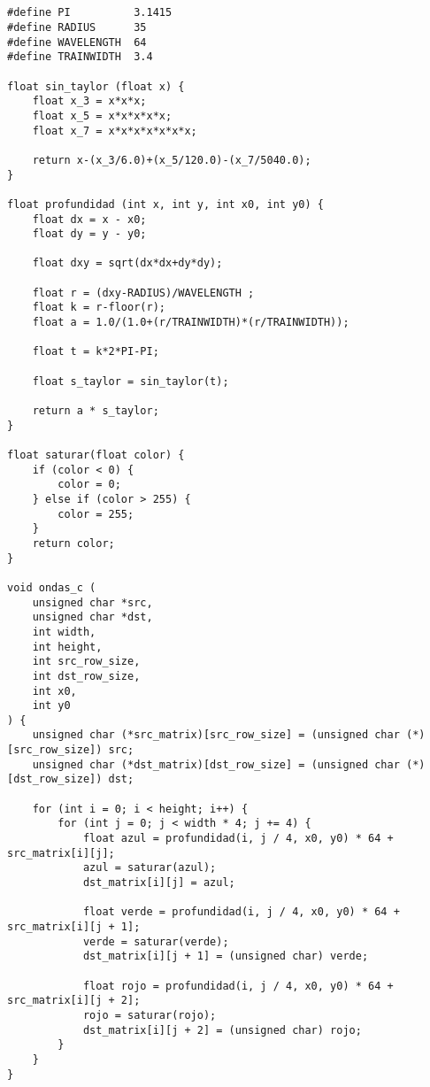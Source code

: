 \begin{codesnippet}
\begin{verbatim}


#define PI 			3.1415
#define RADIUS 		35
#define WAVELENGTH 	64
#define TRAINWIDTH 	3.4

float sin_taylor (float x) {
    float x_3 = x*x*x;
    float x_5 = x*x*x*x*x;
    float x_7 = x*x*x*x*x*x*x;

    return x-(x_3/6.0)+(x_5/120.0)-(x_7/5040.0);
}

float profundidad (int x, int y, int x0, int y0) {
    float dx = x - x0;
    float dy = y - y0;

    float dxy = sqrt(dx*dx+dy*dy);

    float r = (dxy-RADIUS)/WAVELENGTH ;
    float k = r-floor(r);
    float a = 1.0/(1.0+(r/TRAINWIDTH)*(r/TRAINWIDTH));

    float t = k*2*PI-PI;

    float s_taylor = sin_taylor(t);

    return a * s_taylor;
}

float saturar(float color) {
    if (color < 0) {
        color = 0;
    } else if (color > 255) {
        color = 255;
    }
    return color;
}

void ondas_c (
	unsigned char *src,
	unsigned char *dst,
	int width,
	int height,
	int src_row_size,
	int dst_row_size,
	int x0,
	int y0
) {
    unsigned char (*src_matrix)[src_row_size] = (unsigned char (*)[src_row_size]) src;
    unsigned char (*dst_matrix)[dst_row_size] = (unsigned char (*)[dst_row_size]) dst;

    for (int i = 0; i < height; i++) {
        for (int j = 0; j < width * 4; j += 4) {
            float azul = profundidad(i, j / 4, x0, y0) * 64 + src_matrix[i][j];
            azul = saturar(azul);
            dst_matrix[i][j] = azul;

            float verde = profundidad(i, j / 4, x0, y0) * 64 + src_matrix[i][j + 1];
            verde = saturar(verde);
            dst_matrix[i][j + 1] = (unsigned char) verde;

            float rojo = profundidad(i, j / 4, x0, y0) * 64 + src_matrix[i][j + 2];
            rojo = saturar(rojo);
            dst_matrix[i][j + 2] = (unsigned char) rojo;
        }
    }
}
\end{verbatim}
\end{codesnippet}
